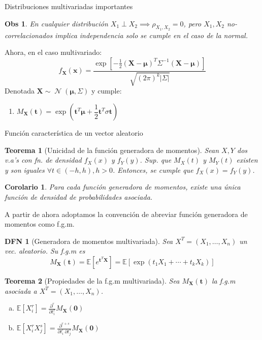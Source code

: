 \documentclass[a4paper]{article}
\newtheorem{definition}{DFN}
\theoremstyle{mytheoremstyle}
\newtheorem{theorem}{Teorema}
\newtheorem{corollary}{Corolario}[theorem]
\newtheorem*{obs}{Obs}
\newcommand{\E}{\mathbb{E}}
\newcommand{\1}{\mathds{1}}
\providecommand{\abs}[1]{\left|#1\right|}
\DeclareMathOperator{\dnormal}{\mathcal{N}}
\renewcommand{\vec}[1]{\boldsymbol{#1}}
\begin{document}
\begin{multicols*}{3}
\begin{roundbox}{Distribuciones multivariadas importantes}
\begin{obs}
    En cualquier distribución $X_1 \perp X_2 \implies \rho_{X_1, X_2} = 0$, pero $X_1, X_2$ no-correlacionados implica independencia solo se cumple en el caso de la normal.
\end{obs}

Ahora, en el caso multivariado:
\begin{equation*}
    f_{\vec{X}}(\vec{x}) = \frac{\exp\left[ -\frac{1}{2} (\vec{X} - \vec{\mu})^{T} \Sigma^{-1} (\vec{X} - \vec{\mu}) \right]}{\sqrt{(2\pi)^{k} \abs{\Sigma} }}
\end{equation*}
Denotada $\vec{X} \sim \dnormal(\vec{\mu}, \Sigma)$ y cumple:
\begin{enumerate}
    \item $M_{\vec{X}}(\vec{t}) = \exp\left(\vec{t}^{T} \vec{\mu} + \dfrac{1}{2} \vec{t}^{T} \sigma \vec{t} \right)$
\end{enumerate}
\end{roundbox}

\begin{roundbox}{Función característica de un vector aleatorio}
\begin{theorem}[Unicidad de la función generadora de momentos]
    Sean $X,Y$ dos v.a's con fn. de densidad $f_{X}(x)$ y $f_{Y}(y)$.
    Sup. que $M_{X}(t)$ y $M_{Y}(t)$ existen y son iguales $\forall t \in (-h, h), h>0$.
    Entonces, se cumple que $f_{X}(x) = f_{Y}(y)$.
\end{theorem}
\begin{corollary}
    Para cada función generadora de momentos, existe una única función de densidad de probabilidades asociada.
\end{corollary}

A partir de ahora adoptamos la convención de abreviar función generadora de momentos como f.g.m.

\begin{definition}[Generadora de momentos multivariada]
    Sea $X^{T} = (X_1, \dots, X_n)$ un vec. aleatorio.
    Su f.g.m es
    \begin{equation*}
        M_{\vec{X}}(\vec{t}) = \E\left[ e^{\vec{t}^{T} \vec{X}} \right] = \E \left[ \exp(t_1 X_1 + \cdots + t_k X_k) \right]
    \end{equation*}
\end{definition}

\begin{theorem}[Propiedades de la f.g.m multivariada]
    Sea $M_{\vec{X}}(\vec{t})$ la f.g.m asociada a $X^{T} = (X_1, \dots, X_n)$.
    \begin{enumerate}[a)]
        \item $\displaystyle \E\left[ X_{i}^{r} \right] = \frac{\partial^{r}}{\partial t_{i}^{r}} M_{\vec{X}} (\vec{0})$
        \item $\displaystyle \E\left[ X_{i}^{r} X_{j}^{s} \right] = \frac{\partial^{r+s}}{\partial t_{i}^{r} \, \partial t_{j}^{s}} M_{\vec{X}} (\vec{0})$
    \end{enumerate} 
\end{theorem}


\end{roundbox}
\end{multicols*}
\end{document}
